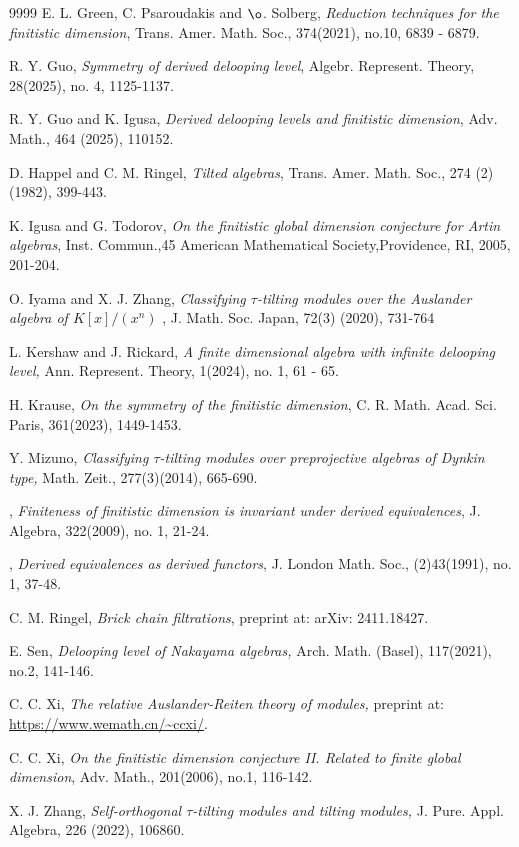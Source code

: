 \documentclass[a4paper]{amsart}
\theoremstyle{definition}
\theoremstyle{remark}
\numberwithin{equation}{section}
\begin{document}
\begin{thebibliography}{9999}
 {\sc E. L. Green, C. Psaroudakis and $\o$. Solberg}, {\em Reduction techniques for the finitistic dimension},  Trans. Amer. Math. Soc., 374(2021), no.10, 6839 - 6879.

 {\sc R. Y. Guo}, {\em Symmetry of derived delooping level}, Algebr. Represent. Theory, 28(2025), no. 4, 1125-1137.

 {\sc  R. Y. Guo and K. Igusa}, {\em Derived delooping levels and finitistic dimension}, Adv. Math., {464} (2025), 110152.

 {\sc D. Happel and C. M. Ringel}, {\em Tilted algebras}, Trans. Amer. Math. Soc., {274} (2) (1982), 399-443.

 {\sc K. Igusa and G. Todorov}, {\em On the finitistic global dimension conjecture for Artin algebras}, Inst. Commun.,45
American Mathematical Society,Providence, RI, 2005, 201-204.

 {\sc O. Iyama and X. J. Zhang}, {\em Classifying $\tau$-tilting modules over the Auslander algebra of $K[x]/(x^{n})$ }, J. Math. Soc. Japan, 72(3) (2020), 731-764

  {\sc L. Kershaw and J. Rickard},  {\em A finite dimensional algebra with infinite delooping level,}
Ann. Represent. Theory, 1(2024), no. 1, 61 - 65.

 {\sc H. Krause}, {\em On the symmetry of the finitistic dimension}, C. R. Math. Acad. Sci. Paris, 361(2023), 1449-1453.

 {\sc Y. Mizuno}, {\em  Classifying $\tau$-tilting modules over preprojective algebras
of Dynkin type,} Math. Zeit., {277}(3)(2014), 665-690.

, {\em Finiteness of finitistic dimension is invariant under derived equivalences},
J. Algebra, 322(2009), no. 1, 21-24.

, {\em Derived equivalences as derived functors}, J. London Math. Soc., (2)43(1991), no. 1, 37-48.

 {\sc C. M. Ringel}, {\em Brick chain filtrations}, preprint at: arXiv: 2411.18427.

 {\sc E. Sen}, {\em Delooping level of Nakayama algebras,} Arch. Math. (Basel), 117(2021), no.2, 141-146.

 {\sc C. C. Xi}, {\em The relative Auslander-Reiten theory of modules,} preprint at: \url{https://www.wemath.cn/~ccxi/}.

 {\sc C. C. Xi},  {\em On the finitistic dimension conjecture II. Related to finite global dimension}, Adv. Math., 201(2006), no.1, 116-142.

 {\sc X. J. Zhang}, {\em Self-orthogonal $\tau$-tilting modules and tilting modules,} J. Pure. Appl. Algebra, {226} (2022), 106860.

\end{thebibliography}
\end{document}

